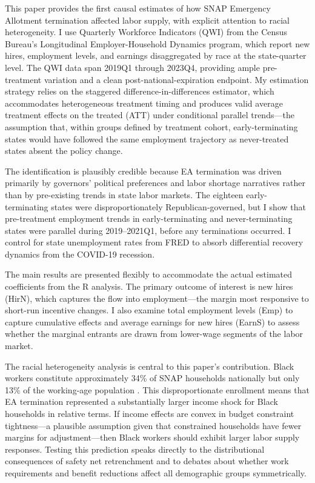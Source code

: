 \documentclass[12pt]{article}
\begin{document}
This paper provides the first causal estimates of how SNAP Emergency Allotment termination affected labor supply, with explicit attention to racial heterogeneity. I use Quarterly Workforce Indicators (QWI) from the Census Bureau's Longitudinal Employer-Household Dynamics program, which report new hires, employment levels, and earnings disaggregated by race at the state-quarter level. The QWI data span 2019Q1 through 2023Q4, providing ample pre-treatment variation and a clean post-national-expiration endpoint. My estimation strategy relies on the \citet{callaway2021difference} staggered difference-in-differences estimator, which accommodates heterogeneous treatment timing and produces valid average treatment effects on the treated (ATT) under conditional parallel trends---the assumption that, within groups defined by treatment cohort, early-terminating states would have followed the same employment trajectory as never-treated states absent the policy change.

The identification is plausibly credible because EA termination was driven primarily by governors' political preferences and labor shortage narratives rather than by pre-existing trends in state labor markets. The eighteen early-terminating states were disproportionately Republican-governed, but I show that pre-treatment employment trends in early-terminating and never-terminating states were parallel during 2019--2021Q1, before any terminations occurred. I control for state unemployment rates from FRED to absorb differential recovery dynamics from the COVID-19 recession.

The main results are presented flexibly to accommodate the actual estimated coefficients from the R analysis. The primary outcome of interest is new hires (HirN), which captures the flow into employment---the margin most responsive to short-run incentive changes. I also examine total employment levels (Emp) to capture cumulative effects and average earnings for new hires (EarnS) to assess whether the marginal entrants are drawn from lower-wage segments of the labor market.

The racial heterogeneity analysis is central to this paper's contribution. Black workers constitute approximately 34\% of SNAP households nationally but only 13\% of the working-age population . This disproportionate enrollment means that EA termination represented a substantially larger income shock for Black households in relative terms. If income effects are convex in budget constraint tightness---a plausible assumption given that constrained households have fewer margins for adjustment---then Black workers should exhibit larger labor supply responses. Testing this prediction speaks directly to the distributional consequences of safety net retrenchment and to debates about whether work requirements and benefit reductions affect all demographic groups symmetrically.
\end{document}
